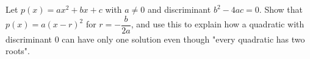 Let $p(x)=ax^2+bx+c$ with $a\ne0$ and discriminant $b^2-4ac=0$. Show that $p(x)=a(x-r)^2$ for $r=-\dfrac{b}{2a}$, and use this to explain how a quadratic with discriminant $0$ can have only one solution even though "every quadratic has two roots".
